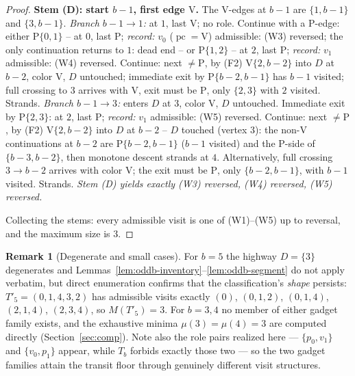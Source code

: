 \documentclass[11pt]{article}
\theoremstyle{definition}
\newtheorem{remark}[theorem]{Remark}
\DeclareMathOperator{\pc}{pc}
\begin{document}
\begin{proof}
\smallskip
\noindent\textbf{Stem (D): start $b-1$, first edge $\mathrm V$.} The V-edges at $b-1$
are $\{1,b-1\}$ and $\{3,b-1\}$.
\emph{Branch $b-1 \to 1$:} at $1$, last $\mathrm V$; no role. Continue with a P-edge:
either $\mathrm P\{0,1\}$ -- at $0$, last $\mathrm P$; \emph{record:} $v_0$
($\pc = \mathrm V$) admissible: (W3) reversed; the only continuation returns to $1$:
dead end -- or $\mathrm P\{1,2\}$ -- at $2$, last $\mathrm P$; \emph{record:} $v_1$
admissible: (W4) reversed. Continue: next $\ne \mathrm P$, by (F2)
$\mathrm V\{2,b-2\}$ into $D$ at $b-2$, color $\mathrm V$, $D$ untouched; immediate
exit by $\mathrm P\{b-2,b-1\}$ has $b-1$ visited; full crossing to $3$ arrives with
$\mathrm V$, exit must be $\mathrm P$, only $\{2,3\}$ with $2$ visited. Strands.
\emph{Branch $b-1 \to 3$:} enters $D$ at $3$, color $\mathrm V$, $D$ untouched.
Immediate exit by $\mathrm P\{2,3\}$: at $2$, last $\mathrm P$; \emph{record:} $v_1$
admissible: (W5) reversed. Continue: next $\ne \mathrm P$, by (F2)
$\mathrm V\{2,b-2\}$ into $D$ at $b-2$ -- $D$ touched (vertex $3$): the
non-$\mathrm V$ continuations at $b-2$ are $\mathrm P\{b-2,b-1\}$ ($b-1$ visited) and
the P-side of $\{b-3,b-2\}$, then monotone descent strands at $4$. Alternatively,
full crossing $3 \to b-2$ arrives with color $\mathrm V$; the exit must be
$\mathrm P$, only $\{b-2,b-1\}$, with $b-1$ visited. Strands.
\emph{Stem (D) yields exactly (W3) reversed, (W4) reversed, (W5) reversed.}

\smallskip
Collecting the stems: every admissible visit is one of (W1)--(W5) up to reversal, and
the maximum size is $3$.
\end{proof}

\begin{remark}[Degenerate and small cases]\label{rem:oddb-small}
For $b = 5$ the highway $D = \{3\}$ degenerates and
Lemmas~\ref{lem:oddb-inventory}--\ref{lem:oddb-segment} do not apply verbatim, but
direct enumeration confirms that the classification's \emph{shape} persists:
$T'_5 = (0,1,4,3,2)$ has admissible visits exactly $(0)$, $(0,1,2)$, $(0,1,4)$,
$(2,1,4)$, $(2,3,4)$, so $M(T'_5) = 3$. For $b = 3, 4$ no member of either gadget
family exists, and the exhaustive minima $\mu(3) = \mu(4) = 3$ are computed directly
(Section~\ref{sec:comp}). Note also the role pairs realized here ---
$\{p_0, v_1\}$ and $\{v_0, p_1\}$ appear, while $T_b$ forbids exactly those two ---
so the two gadget families attain the transit floor through genuinely different visit
structures.
\end{remark}
\end{document}
